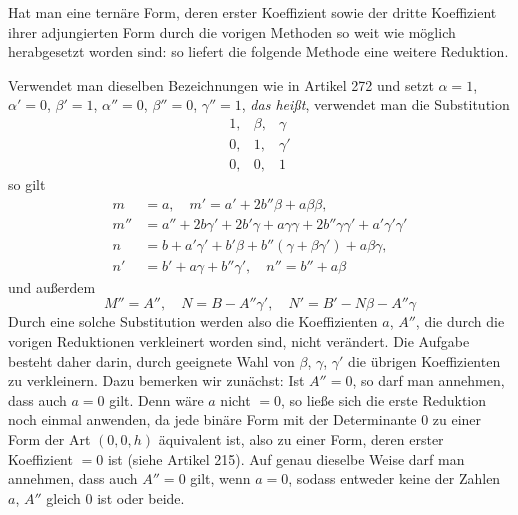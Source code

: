 Hat man eine ternäre Form, deren erster Koeffizient sowie der dritte Koeffizient ihrer adjungierten Form durch die vorigen Methoden so weit wie möglich herabgesetzt worden sind: so liefert die folgende Methode eine weitere Reduktion.

Verwendet man dieselben Bezeichnungen wie in Artikel 272 und setzt \(\alpha=1\), \(\alpha'=0\), \(\beta'=1\), \(\alpha''=0\), \(\beta''=0\), \(\gamma''=1\), \emph{das heißt}, verwendet man die Substitution
\[
\begin{array}{ccc}
1,&\beta,&\gamma\\
0,&1,&\gamma'\\
0,&0,&1
\end{array}
\]
so gilt
\[
\begin{aligned}
m&=a,\quad m'=a'+2b''\beta+a\beta\beta,\\
m''&=a''+2b\gamma'+2b'\gamma+a\gamma\gamma+2b''\gamma\gamma'+a'\gamma'\gamma'\\
n&=b+a'\gamma'+b'\beta+b''(\gamma+\beta\gamma')+a\beta\gamma,\\
n'&=b'+a\gamma+b''\gamma',\quad n''=b''+a\beta
\end{aligned}
\]
und außerdem
\[
M''=A'',\quad N=B-A''\gamma',\quad N'=B'-N\beta-A''\gamma
\]
Durch eine solche Substitution werden also die Koeffizienten \(a\), \(A''\), die durch die vorigen Reduktionen verkleinert worden sind, nicht verändert. Die Aufgabe besteht daher darin, durch geeignete Wahl von \(\beta\), \(\gamma\), \(\gamma'\) die übrigen Koeffizienten zu verkleinern. Dazu bemerken wir zunächst: Ist \(A''=0\), so darf man annehmen, dass auch \(a=0\) gilt. Denn wäre \(a\) nicht \(=0\), so ließe sich die erste Reduktion noch einmal anwenden, da jede binäre Form mit der Determinante \(0\) zu einer Form der Art \((0,0,h)\) äquivalent ist, also zu einer Form, deren erster Koeffizient \(=0\) ist (siehe Artikel 215). Auf genau dieselbe Weise darf man annehmen, dass auch \(A''=0\) gilt, wenn \(a=0\), sodass entweder keine der Zahlen \(a\), \(A''\) gleich \(0\) ist oder beide.

